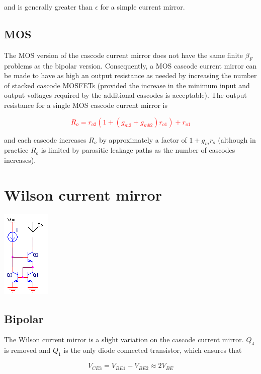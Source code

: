 and is generally greater than $\epsilon$ for a simple current mirror.

\subsection{MOS}
The MOS version of the cascode current mirror does not have the same finite $\beta_{F}$ problems as the bipolar version.
Consequently, a MOS cascode current mirror can be made to have as high an output resistance as needed by increasing the number of stacked cascode MOSFETs (provided the increase in the minimum input and output voltages required by the additional cascodes is acceptable).
The output resistance for a single MOS cascode current mirror is

\textcolor{red}{
\begin{equation}
R_{o} = r_{o2}(1+(g_{m2}+g_{mb2})r_{o1})+ r_{o1}
\end{equation}
}

and each cascode increases $R_{o}$ by approximately a factor of $1+g_{m}r_{o}$ (although in practice $R_{o}$ is limited by parasitic leakage paths as the number of cascodes increases). \autocite[263-268]{analysis-design-analog-ics}

\section{Wilson current mirror}
\begin{center}
	\includegraphics{schematics/wilsoncurrentmirror.PNG}
\end{center}

\subsection{Bipolar}
The Wilson current mirror is a slight variation on the cascode current mirror.
$Q_4$ is removed and $Q_1$ is the only diode connected transistor, which ensures that

\begin{equation}
V_{CE3} = V_{BE1} + V_{BE2} \approx 2V_{BE}
\end{equation}

